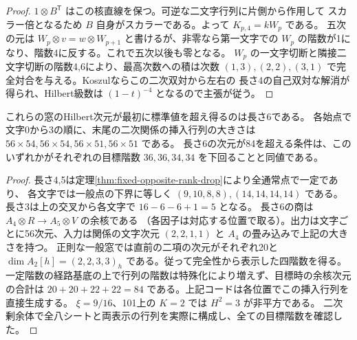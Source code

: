 \begin{proof}
$1\otimes B^{\mathsf T}$ はこの核直線を保つ。可逆な二文字行列に片側から作用して
スカラー倍となるため $B$ 自身がスカラーである。よって $K_{p,4}=kW_p$ である。
五次の元は $W_p\otimes v=w\otimes W_{p+1}$ と書けるが、非零なら第一文字での
$W_p$ の階数が1になり、階数4に反する。これで五次以後も零となる。
$W_p$ の一文字切断と隣接二文字切断の階数4,6により、最高次数への積は次数
$(1,3),(2,2),(3,1)$ で完全対合を与える。Koszulならこの二次双対から左右の
長さ4の自己双対な解消が得られ、Hilbert級数は $(1-t)^{-4}$ となるので主張が従う。
\end{proof}

\begin{corollary}\label{cor:rank-fifteen-sixth-test}
これらの窓のHilbert次元が最初に標準値を超え得るのは長さ6である。
各始点で文字0から3の順に、末尾の二次関係の挿入行列の大きさは
$56\times54,56\times54,56\times51,56\times51$ である。
長さ6の次元が84を超える条件は、このいずれかがそれぞれの目標階数
$36,36,34,34$ を下回ることと同値である。
\end{corollary}
\begin{proof}
長さ4,5は定理\ref{thm:fixed-opposite-rank-drop}により全通常点で一定であり、
各文字では一般点の下界に等しく $(9,10,8,8),(14,14,14,14)$ である。
長さ3は上の交叉から各文字で $16-6-6+1=5$ となる。
長さ6の商は $A_4\otimes R\longrightarrow A_5\otimes V$ の余核である
（各因子は対応する位置で取る）。出力は文字ごとに56次元、入力は関係の文字次元
$(2,2,1,1)$ と $A_4$ の畳み込みで上記の大きさを持つ。
正則な一般窓では直前の二項の次元がそれぞれ20と
$\dim A_2[h]=(2,2,3,3)_h$ である。従って完全性から表示した四階数を得る。
一定階数の経路基底の上で行列の階数は特殊化により増えず、目標時の余核次元の合計は
$20+20+22+22=84$ である。上記コードは各位置でこの挿入行列を直接生成する。
$\xi=9/16$、101上の $K=2$ では $H^2=3$ が非平方である。
二次剰余体で全八シートと両表示の行列を実際に構成し、全ての目標階数を確認した。
\end{proof}

